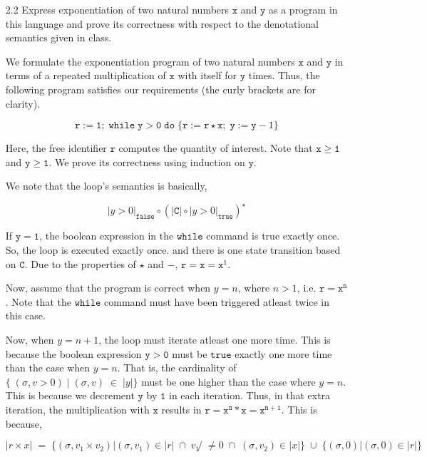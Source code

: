 \documentclass[a4paper,10pt]{article}
\newcommand{\C}{\mathtt{C}}
\newcommand{\true}{\mathtt{true}}
\newcommand{\false}{\mathtt{false}}
\newcommand{\whilesym}{\mathtt{while}}
\newcommand{\dosym}{\mathtt{do}}
\newcommand{\question}[1]
{\color{DarkBlue}#1 \color{Black} \newline}
\begin{document}
\begin{enumerate}
\question{
\item[2.2] Express exponentiation of two natural numbers $\mathtt{x}$ and $\mathtt{y}$ as a program
in this language and prove its correctness with respect to the denotational semantics given in class.
}

We formulate the exponentiation program of two natural numbers $\mathtt{x}$ and
$\mathtt{y}$ in terms of a repeated multiplication of $\mathtt{x}$ with itself
for $\mathtt{y}$ times.
Thus, the following program satisfies our requirements (the curly brackets are
for clarity).

$$ \mathtt{r} := \mathtt{1}; \; \whilesym \; \mathtt{y} > \mathtt{0} \; \dosym
\; \{ \mathtt{r} := \mathtt{r} \star \mathtt{x} ; \; \mathtt{y} := \mathtt{y} -
1 \} $$

Here, the free identifier $\mathtt{r}$ computes the quantity of interest. Note
that $\mathtt{x} \geq \mathtt{1} $ and $\mathtt{y} \geq \mathtt{1}$. We prove
its correctness using induction on $\mathtt{y}$.

We note that the loop's semantics is basically,

$$| y > 0 |_{\false} \circ (| \C | \circ | y > 0 |_{\true} )^{\star}$$

If $\mathtt{y} = \mathtt{1}$, the boolean expression in the $\whilesym$ command
is true exactly once. So, the loop is executed exactly once.
and there is one state transition based on $\C$.
Due to the properties of $\star$ and $-$, 
$\mathtt{r} = \mathtt{x} = \mathtt{x}^{\mathtt{1}} $.

Now, assume that the program is correct when $y = n$, where $n > 1$, i.e.
$\mathtt{r} = \mathtt{x}^{\mathtt{n}}$. Note that the $\whilesym$ command must have been 
triggered atleast twice in this case. 

Now, when $y = n + 1$, the loop must iterate atleast one more time. This is
because the boolean expression $\mathtt{y} > \mathtt{0}$ must
be $\true$ exactly one more time than the case when  $y = n$. That is,
the cardinality of
$\{ \; ( \sigma, v > 0) \; |  \; (\sigma, v) \; \in \; | y | \}$
must be one higher than the case where $y = n$.
This is because we decrement $\mathtt{y}$ by $\mathtt{1}$ in each iteration.
Thus, in that extra iteration, the multiplication with $\mathtt{x}$ results in
$\mathtt{r} = \mathtt{x}^{\mathtt{n}}  * \mathtt{x} =
\mathtt{x}^{\mathtt{n+1}}$. This is because,

$$
| r \times x | \; = \; \{ (\sigma, v_{1} \times v_{2}) | (\sigma, v_{1}) \in 
| r | \; \cap \; v_{1} ̸\neq 0 \; \cap \; (\sigma, v_{2}) \in | x | \} 
\; \cup \; \{ ( \sigma, 0) | ( \sigma, 0) \in | r | \} 
$$


\end{enumerate}
\end{document}
